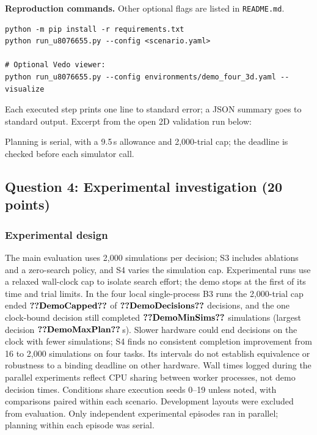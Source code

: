\textbf{Reproduction commands.} Other optional flags are listed in \texttt{README.md}.
\begin{lstlisting}[style=terminal,keepspaces=true]
python -m pip install -r requirements.txt
python run_u8076655.py --config <scenario.yaml>

# Optional Vedo viewer:
python run_u8076655.py --config environments/demo_four_3d.yaml --visualize
\end{lstlisting}
\noindent\begin{minipage}{\linewidth}
\setlength{\parskip}{4pt}
Each executed step prints one line to standard error; a JSON summary goes to
standard output. Excerpt from the open 2D validation run below:

\end{minipage}
Planning is serial, with a 9.5\,s allowance and 2,000-trial cap; the
deadline is checked before each simulator call.


\subsection*{Question 4: Experimental investigation (20 points)}
\subsubsection*{Experimental design}
The main evaluation uses 2,000 simulations per decision; S3 includes
ablations and a zero-search policy, and S4 varies the simulation cap.
Experimental runs use a relaxed wall-clock cap to isolate search effort;
the demo stops at the first of its time and trial limits. In the four
local single-process B3 runs the
2,000-trial cap ended $\val{DemoCapped}$ of $\val{DemoDecisions}$ decisions,
and the one clock-bound decision still completed $\val{DemoMinSims}$
simulations (largest decision $\val{DemoMaxPlan}$\,s). Slower hardware could
end decisions on the clock with fewer simulations; S4 finds no consistent
completion improvement from 16 to 2,000 simulations on four tasks.
Its intervals do not establish
equivalence or robustness to a binding deadline on other hardware.
Wall times logged during the parallel experiments reflect CPU sharing between
worker processes, not demo decision times. Conditions share execution seeds 0--19
unless noted, with comparisons paired within each scenario.
Development layouts were excluded from evaluation. Only independent
experimental episodes ran in parallel; planning within each episode was serial.

